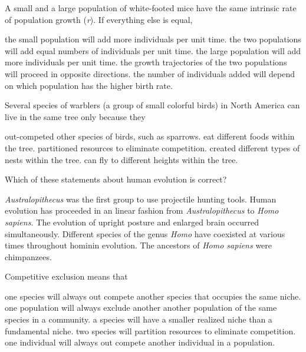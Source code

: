 \newpage

\question
A small and a large population of white-footed mice have the same intrinsic rate of population growth (\textit{r}).  If everything else is equal, 

\begin{choices}
\choice the small population will add more individuals per unit time. 
\choice the two populations will add equal numbers of individuals per unit time.
\correctchoice the large population will add more individuals per unit time.  
\choice the growth trajectories of the two populations will proceed in opposite directions. 
\choice the number of individuals added will depend on which population has the higher birth rate. 
\end{choices}

\question
Several species of warblers (a group of small colorful birds) in North America can live in the same tree only because they

\begin{choices}
\choice out-competed other species of birds, such as sparrows.
\choice eat different foods within the tree.
\correctchoice partitioned resources to eliminate competition.
\choice created different types of nests within the tree.
\choice can fly to different heights within the tree.
\end{choices}

\question
Which of these statements about human evolution is correct?  

\begin{choices}
\choice \textit{Australopithecus} was the first group to use projectile hunting tools. 
\choice Human evolution has proceeded in an linear fashion from \textit{Australopithecus} to \textit{Homo sapiens.}   
\choice The evolution of upright posture and enlarged brain occurred simultaneously.   
\correctchoice Different species of the genus \textit{Homo} have coexisted at various times throughout hominin evolution.   
\choice The ancestors of \textit{Homo sapiens} were chimpanzees.   
\end{choices}

\question
Competitive exclusion means that

\begin{choices}
\correctchoice one species will always out compete another species that occupies the same niche.  
\choice one population will always exclude another another population of the same species in a community. 
\choice a species will have a smaller realized niche than a fundamental niche. 
\choice two species will partition resources to eliminate competition. 
\choice one individual will always out compete another individual in a population. 
\end{choices}

